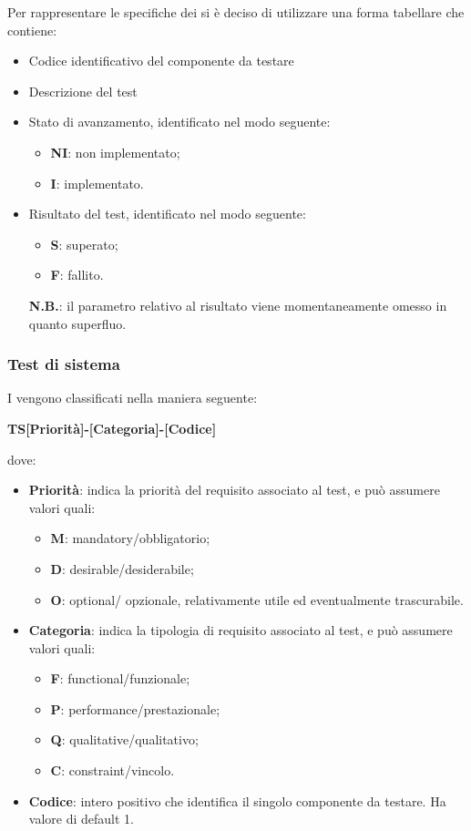 		Per rappresentare le specifiche dei  si è deciso di utilizzare una forma tabellare che contiene:
		\begin{itemize}
			\item Codice identificativo del componente da testare
			\item Descrizione del test
			\item Stato di avanzamento, identificato nel modo seguente:
				\begin{itemize}
					\item \textbf{NI}: non implementato;
					\item \textbf{I}: implementato.						
				\end{itemize}		
			\item Risultato del test, identificato nel modo seguente:
				\begin{itemize}
					\item \textbf{S}: superato;
					\item \textbf{F}: fallito.
				\end{itemize}
				\textbf{N.B.}: il parametro relativo al risultato viene momentaneamente omesso in quanto superfluo.						 
		\end{itemize}				
		
		\subsubsection{Test di sistema}
		I  vengono classificati nella maniera seguente:
		\begin{center}
			\textbf{TS[Priorità]-[Categoria]-[Codice]}
		\end{center}		 
		dove:\\
		\begin{itemize}
			\item \textbf{Priorità}: indica la priorità del requisito associato al test, e può assumere valori quali:
			\begin{itemize}
				\item \textbf{M}: mandatory/obbligatorio;
				\item \textbf{D}: desirable/desiderabile;
				\item \textbf{O}: optional/ opzionale, relativamente utile ed eventualmente trascurabile.
			\end{itemize}
			\item \textbf{Categoria}: indica la tipologia di requisito associato al test, e può assumere valori quali:
			\begin{itemize}
				\item \textbf{F}: functional/funzionale;
				\item \textbf{P}: performance/prestazionale;
				\item \textbf{Q}: qualitative/qualitativo;
				\item \textbf{C}: constraint/vincolo.
			\end{itemize}
			\item \textbf{Codice}: intero positivo che identifica il singolo componente da testare. Ha valore di default 1.
		\end{itemize}
		 
